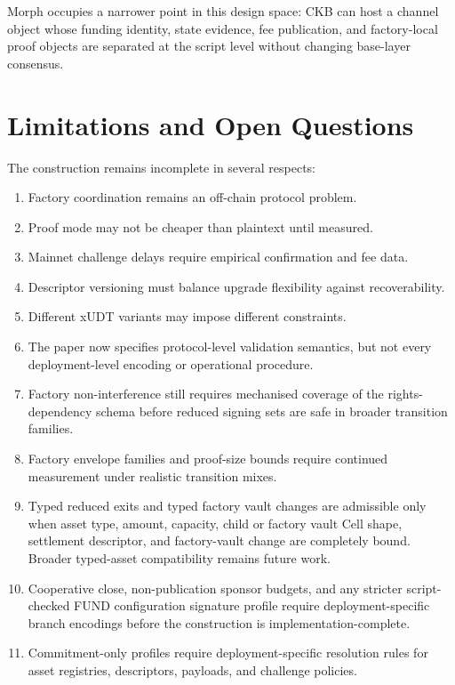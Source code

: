 \documentclass[a4paper,11pt]{article}
\begin{document}
Morph occupies a narrower point in this design space: CKB can host a channel object whose funding identity, state evidence, fee publication, and factory-local proof objects are separated at the script level without changing base-layer consensus.

\clearpage
\section{Limitations and Open Questions}

The construction remains incomplete in several respects:
\begin{enumerate}[label=O\arabic*.]
  \item Factory coordination remains an off-chain protocol problem.
  \item Proof mode may not be cheaper than plaintext until measured.
  \item Mainnet challenge delays require empirical confirmation and fee data.
  \item Descriptor versioning must balance upgrade flexibility against recoverability.
  \item Different xUDT variants may impose different constraints.
  \item The paper now specifies protocol-level validation semantics, but not every deployment-level encoding or operational procedure.
  \item Factory non-interference still requires mechanised coverage of the rights-dependency schema before reduced signing sets are safe in broader transition families.
  \item Factory envelope families and proof-size bounds require continued measurement under realistic transition mixes.
  \item Typed reduced exits and typed factory vault changes are admissible only when asset type, amount, capacity, child or factory vault Cell shape, settlement descriptor, and factory-vault change are completely bound. Broader typed-asset compatibility remains future work.
  \item Cooperative close, non-publication sponsor budgets, and any stricter script-checked \textsf{FUND} configuration signature profile require deployment-specific branch encodings before the construction is implementation-complete.
  \item Commitment-only profiles require deployment-specific resolution rules for asset registries, descriptors, payloads, and challenge policies.
\end{enumerate}
\end{document}
